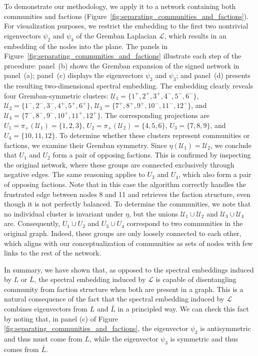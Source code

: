 \documentclass[reprint,onecolumn]{article}
\newcommand{\mc}[1]{\mathcal{#1}}
\newcommand{\1}{\mathbb{1}}
\newcommand{\0}{\mathbf{0}}
\begin{document}
To demonstrate our methodology, we apply it to a network containing both communities and factions (Figure~\ref{fig:separating_communities_and_factions}). For visualization purposes, we restrict the embedding to the first two nontrivial eigenvectors \( \psi_2 \) and \( \psi_3 \) of the Gremban Laplacian $\mc L$, which results in an embedding of the nodes into the plane. The panels in Figure~\ref{fig:separating_communities_and_factions} illustrate each step of the procedure: panel~(b) shows the Gremban expansion of the signed network in panel~(a); panel~(c) displays the eigenvectors \( \psi_2 \) and \( \psi_3 \); and panel~(d) presents the resulting two-dimensional spectral embedding. The embedding clearly reveals four Gremban-symmetric clusters: \( \mathcal{U}_1 = \{1^+, 2^+, 3^+, 4^-, 5^-, 6^-\} \), \( \mathcal{U}_2 = \{1^-, 2^-, 3^-, 4^+, 5^+, 6^+\} \), \( \mathcal{U}_3 = \{7^+, 8^+, 9^+, 10^-,11^-, 12^-\} \), and \( \mathcal{U}_4 = \{7^-, 8^-, 9^-, 10^+,11^+, 12^+\} \). The corresponding projections are \( U_1 = \pi_+(\mc U_1) = \{1, 2, 3\} \), \( U_2 = \pi_+(\mc U_2) = \{4,5,6\} \), \( U_3 = \{7,8,9\} \), and \( U_4 = \{10,11,12\} \). To determine whether these clusters represent communities or factions, we examine their Gremban symmetry. Since \( \eta(\mathcal{U}_1) = \mathcal{U}_2 \), we conclude that \( U_1 \) and \( U_2 \) form a pair of opposing factions. This is confirmed by inspecting the original network, where these groups are connected exclusively through negative edges. The same reasoning applies to \( U_3 \) and \( U_4 \), which also form a pair of opposing factions. Note that in this case the algorithm correctly handles the frustrated edge between nodes 8 and 11 and retrieves the faction structure, even though it is not perfectly balanced. To determine the communities, we note that no individual cluster is invariant under \( \eta \), but the unions \( \mathcal{U}_1 \cup \mathcal{U}_2 \) and \( \mathcal{U}_3 \cup \mathcal{U}_4 \) are. Consequently, \( U_1 \cup U_2 \) and \( U_3 \cup U_4 \) correspond to two communities in the original graph. Indeed, these groups are only loosely connected to each other, which aligns with our conceptualization of communities as sets of nodes with few links to the rest of the network.

In summary, we have shown that, as opposed to the spectral embeddings induced by $L$ or $\bar L$, the spectral embedding induced by $\mc L$ is capable of disentangling community from faction structure when both are present in a graph. This is a natural consequence of the fact that the spectral embedding induced by $\mc L$ combines eigenvectors from $L$ and $\bar L$ in a principled way. We can check this fact by noting that, in panel (c) of Figure \ref{fig:separating_communities_and_factions},  the eigenvector $\psi_2$ is antisymmetric and thus must come from $L$, while the eigenvector $\psi_3$ is symmetric and thus comes from $\bar L$. 
%
\end{document}
